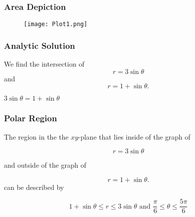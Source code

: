 \documentclass{beamer}
\begin{document}
\begin{frame}
\frametitle{Area Depiction}


\begin{figure}[r]
 \raggedleft
	\texttt{[image: Plot1.png]}
\end{figure}



\vspace{6.5 cm}
\end{frame}






\begin{frame}
\frametitle{Analytic Solution}
We find the intersection of 
\begin{equation}
	r=3\sin \theta
\end{equation}
and
 \begin{equation} 
  	r=1+ \sin \theta.
\end{equation}

$\displaystyle 3 \sin \theta = 1 + \sin \theta$

\vspace{6.5 cm}
\end{frame}



\begin{frame}
\frametitle{Polar Region}


The region in the the $xy$-plane that lies inside of the graph of 

\begin{equation}
	r=3\sin \theta
\end{equation}

  and outside of the graph of 

 \begin{equation} 
  	r=1+ \sin \theta.
\end{equation}
can be described by

\begin{equation} 
   1 + \sin \theta \leq r \leq 	3 \sin \theta  \textrm{ and } \frac{\pi}{6} \leq \theta \leq \frac{5\pi}{6}
\end{equation}

\vspace{6.5 cm}
\end{frame}
\end{document}
